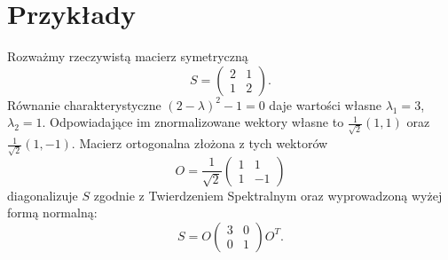 \section{Przykłady}

\begin{example}
Rozważmy rzeczywistą macierz symetryczną
$$S = \begin{pmatrix} 2 & 1 \\ 1 & 2 \end{pmatrix}.$$
Równanie charakterystyczne $(2-\lambda)^2 - 1 = 0$ daje wartości własne $\lambda_1 = 3$, $\lambda_2 = 1$. Odpowiadające im znormalizowane wektory własne to $\frac{1}{\sqrt{2}}(1,1)$ oraz $\frac{1}{\sqrt2}(1,-1)$. Macierz ortogonalna złożona z tych wektorów
$$O = \frac{1}{\sqrt2}\begin{pmatrix} 1 & 1 \\ 1 & -1 \end{pmatrix}$$
diagonalizuje $S$ zgodnie z Twierdzeniem Spektralnym oraz wyprowadzoną wyżej formą normalną:
$$S = O\begin{pmatrix} 3 & 0 \\ 0 & 1 \end{pmatrix} O^T.$$
\end{example}

